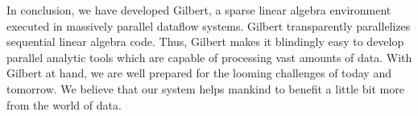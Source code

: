 In conclusion, we have developed Gilbert, a sparse linear algebra environment executed in massively parallel dataflow systems.
Gilbert transparently parallelizes sequential linear algebra code.
Thus, Gilbert makes it blindingly easy to develop parallel analytic tools which are capable of processing vast amounts of data.
With Gilbert at hand, we are well prepared for the looming challenges of today and tomorrow.
We believe that our system helps mankind to benefit a little bit more from the world of data.